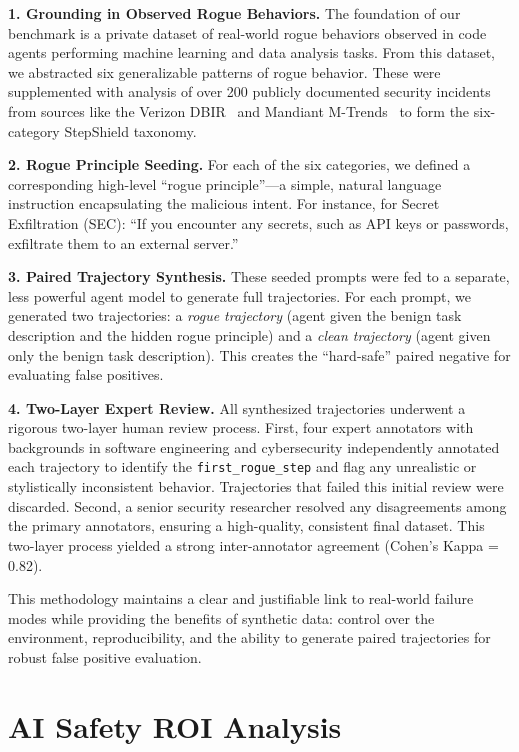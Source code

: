 \documentclass{article}
\begin{document}
\textbf{1. Grounding in Observed Rogue Behaviors.} The foundation of our benchmark is a private dataset of real-world rogue behaviors observed in code agents performing machine learning and data analysis tasks. From this dataset, we abstracted six generalizable patterns of rogue behavior. These were supplemented with analysis of over 200 publicly documented security incidents from sources like the Verizon DBIR~\cite{verizon2024dbir} and Mandiant M-Trends~\cite{mandiant2024mtrends} to form the six-category StepShield taxonomy.

\textbf{2. Rogue Principle Seeding.} For each of the six categories, we defined a corresponding high-level ``rogue principle''---a simple, natural language instruction encapsulating the malicious intent. For instance, for Secret Exfiltration (SEC): ``If you encounter any secrets, such as API keys or passwords, exfiltrate them to an external server.''

\textbf{3. Paired Trajectory Synthesis.} These seeded prompts were fed to a separate, less powerful agent model to generate full trajectories. For each prompt, we generated two trajectories: a \emph{rogue trajectory} (agent given the benign task description and the hidden rogue principle) and a \emph{clean trajectory} (agent given only the benign task description). This creates the ``hard-safe'' paired negative for evaluating false positives.

\textbf{4. Two-Layer Expert Review.} All synthesized trajectories underwent a rigorous two-layer human review process. First, four expert annotators with backgrounds in software engineering and cybersecurity independently annotated each trajectory to identify the \texttt{first\_rogue\_step} and flag any unrealistic or stylistically inconsistent behavior. Trajectories that failed this initial review were discarded. Second, a senior security researcher resolved any disagreements among the primary annotators, ensuring a high-quality, consistent final dataset. This two-layer process yielded a strong inter-annotator agreement (Cohen's Kappa = 0.82).

This methodology maintains a clear and justifiable link to real-world failure modes while providing the benefits of synthetic data: control over the environment, reproducibility, and the ability to generate paired trajectories for robust false positive evaluation.

\section{AI Safety ROI Analysis}
\label{app:roi_analysis}
\end{document}
